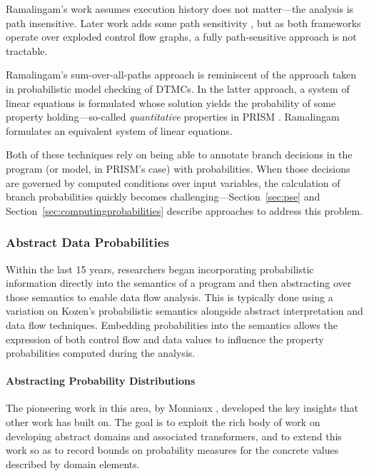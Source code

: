 Ramalingam's work assumes execution history does not 
matter---the analysis is path insensitive.
Later work adds some path sensitivity \cite{mehofer2001novel}, 
but as both frameworks operate over exploded control flow graphs, a fully 
path-sensitive approach is not tractable.

Ramalingam's sum-over-all-paths approach is reminiscent of
the approach taken in probabilistic model checking of DTMCs.
In the latter approach, a system of linear equations is formulated
whose solution yields the probability of some property
holding---so-called \textit{quantitative} properties in 
PRISM \cite{kwiatkowska2010advances}.   Ramalingam formulates an
equivalent system of linear equations.  

Both of these techniques rely on being able to annotate
branch decisions in the program (or model, in PRISM's case)
with probabilities.  When those decisions are governed by
computed conditions over input variables, the calculation of
branch probabilities quickly becomes challenging---Section~\ref{sec:pse} 
and Section~\ref{sec:computingprobabilities} describe approaches
to  address this problem.


\subsubsection{Abstract Data Probabilities}
Within the last 15 years, researchers 
began incorporating probabilistic information directly into
the semantics of a program and then abstracting over 
those semantics 
\cite{monniaux2000abstract,smith2008probabilistic,cousot2012probabilistic}
to enable data flow analysis.
This is typically done using a variation on Kozen's 
probabilistic semantics \cite{kozen1981semantics} 
alongside abstract interpretation and data flow techniques.
Embedding probabilities into the semantics allows 
the expression of both control flow and data values to influence
the property probabilities computed during the analysis.

\paragraph{Abstracting Probability Distributions}
The pioneering work in this area, by 
Monniaux \cite{monniaux2000abstract,monniaux2001backwards},
developed the key insights that other work has built on. 
The goal is to exploit the rich body of work on developing
abstract domains and associated transformers, and to extend this work 
so as to record bounds on probability measures for the concrete values
described by domain elements.

